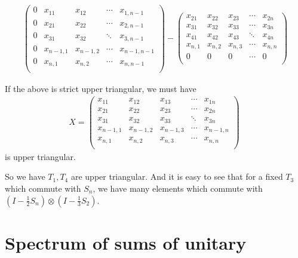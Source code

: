 \documentclass[a4paper,10pt]{amsart}
\begin{document}
\begin{align*}
\begin{pmatrix}
       0 & x_{11} & x_{12} & \cdots & x_{1,n-1} \\
       0 & x_{21} & x_{22} & \cdots & x_{2,n-1}\\
       0 & x_{31} & x_{32} & \ddots & x_{3,n-1} \\
       0 &  x_{n-1,1} &  x_{n-1,2} & \cdots & x_{n-1,n-1}  \\
       0  & x_{n,1}  & x_{n,2}  & \cdots & x_{n,n-1}   \\
    \end{pmatrix} -  
    \begin{pmatrix} 
       x_{21} & x_{22} & x_{23} & \cdots & x_{2n} \\
       x_{31} & x_{32} & x_{33} & \cdots & x_{3n}\\
       x_{41} & x_{42} & x_{43} & \ddots & x_{4n} \\
       x_{n,1} &  x_{n,2} &  x_{n,3} & \cdots & x_{n,n}  \\
       0  & 0  & 0  & \cdots & 0   \\
    \end{pmatrix}
\end{align*}

If the above is strict upper triangular, we must have 
\begin{align*}
    X= \begin{pmatrix} 
       x_{11} & x_{12} & x_{13} & \cdots & x_{1n} \\
       x_{21} & x_{22} & x_{23} & \cdots & x_{2n}\\
       x_{31} & x_{32} & x_{33} & \ddots & x_{3n} \\
       x_{n-1,1} &  x_{n-1,2} &  x_{n-1,3} & \cdots & x_{n-1,n}  \\
       x_{n,1}  & x_{n,2}  & x_{n,3}  & \cdots & x_{n,n}   \\
    \end{pmatrix}\
\end{align*}
is upper triangular.

So we have $T_1, T_4$ are upper triangular.
And it is easy to see that for a fixed $T_3$ which commute with $S_n$, we have many
elements which commute with $(I-\frac{1}{2}S_n) \otimes (I- \frac{1}{3}S_2)$.
 
\section{Spectrum of sums of unitary}
\end{document}
